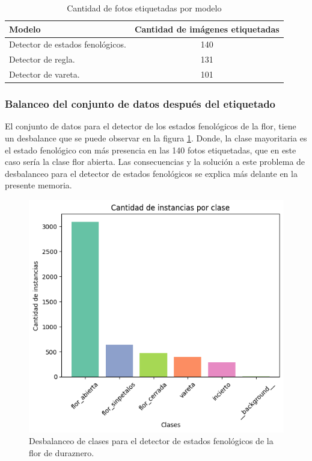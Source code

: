 \begin{table}[h]
	\centering
	\caption{Cantidad de fotos etiquetadas por modelo}
	\begin{tabular}{l c }    
		\toprule
		\textbf{Modelo}     & \textbf{Cantidad de imágenes etiquetadas} \\
		\midrule
		Detector de estados fenológicos.                  & 140 \\
		Detector de regla.                  & 131 \\
		Detector de vareta.                  & 101 \\		
		\bottomrule
		\hline
	\end{tabular}
	\label{tab:etiquetado}
\end{table}

\subsubsection{Balanceo del conjunto de datos después del etiquetado}

El conjunto de datos para el detector de los estados fenológicos de la flor, tiene un desbalance que se puede observar en la figura \ref{fig:desbalanceoDeteccion}. Donde, la clase mayoritaria es el estado fenológico con más presencia en las 140 fotos etiquetadas, que en este caso sería la clase flor abierta. Las consecuencias y la solución a este problema de desbalanceo para el detector de estados fenológicos se explica más delante en la presente memoria.

\begin{figure}[htp]
	\centering
	\includegraphics[scale=.6]{./Figures/desbalanceo_detector.png}
	\caption{Desbalanceo de clases para el detector de estados fenológicos de la flor de duraznero.}
	\label{fig:desbalanceoDeteccion}
\end{figure}
\newpage

